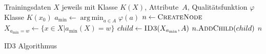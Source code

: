 \documentclass{article}
\DeclareMathOperator*{\argmin}{arg\,min}
\begin{document}
\begin{preview}
    \begin{algorithm}[H]
        \begin{algorithmic}
        \Require Trainingsdaten $X$ jeweils mit Klasse $K(X)$, Attribute~$A$,
                 Qualitätsfunktion $\varphi$
                \State \Return Klasse $K(x_0)$
            \Else
                \State $a_\text{min} \gets \argmin_{a \in A} \varphi(a)$
                \State $n \gets \Call{CreateNode}{}$
                    \State $X_{a_\text{min} = w} \gets \{x \in X | a_\text{min}(X) = w\}$
                    \State $child \gets \Call{ID3}{X_{a_\text{min}}, A}$
                    \State $n.\Call{AddChild}{child}$
                \EndFor
                \State \Return $n$
            \EndIf
        \EndProcedure
        \end{algorithmic}
    \caption{ID3 Algorithmus}
    \label{alg:ID3}
    \end{algorithm}
\end{preview}
\end{document}
